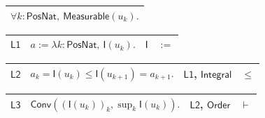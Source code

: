 \documentclass[11pt]{amsart}
\newlength{\FTCOneColumnBody}
\newlength{\FTCFourColumnBody}
\begin{document}
{\begin{tabular}{|@{}>{\centering\arraybackslash}m{\FTCOneColumnBody}|}
$\displaystyle \forall k:\textsf{PosNat},\ \textsf{Measurable}(u_k).$\\ \hline
\end{tabular}%
\par\setlength{\parskip}{0pt}\nointerlineskip
\noindent
\begin{tabular}{|@{}>{\centering\arraybackslash}m{0.078431\FTCFourColumnBody}|>{\centering\arraybackslash}m{0.535947\FTCFourColumnBody}|>{\centering\arraybackslash}m{0.281045\FTCFourColumnBody}|>{\centering\arraybackslash}m{0.104575\FTCFourColumnBody}|}\hline
\hypertarget{proof:L1}{$\displaystyle \textsf{L1}$} & $\displaystyle a:=\lambda k:\textsf{PosNat},\ \textsf{I}(u_k).$ & \hyperlink{def:I}{$\displaystyle \textsf{I}$} & $\displaystyle :=$\\ \hline
\end{tabular}%
\par\setlength{\parskip}{0pt}\nointerlineskip
\noindent
\begin{tabular}{|@{}>{\centering\arraybackslash}m{0.078431\FTCFourColumnBody}|>{\centering\arraybackslash}m{0.535947\FTCFourColumnBody}|>{\centering\arraybackslash}m{0.281045\FTCFourColumnBody}|>{\centering\arraybackslash}m{0.104575\FTCFourColumnBody}|}\hline
\hypertarget{proof:L2}{$\displaystyle \textsf{L2}$} & $\displaystyle a_k=\textsf{I}(u_k)\le\textsf{I}(u_{k+1})=a_{k+1}.$ & \hyperlink{proof:L1}{$\displaystyle \textsf{L1}$}, \hyperlink{lem:Integral}{$\displaystyle \textsf{Integral}$} & $\displaystyle \le$\\ \hline
\end{tabular}%
\par\setlength{\parskip}{0pt}\nointerlineskip
\noindent
\begin{tabular}{|@{}>{\centering\arraybackslash}m{0.078431\FTCFourColumnBody}|>{\centering\arraybackslash}m{0.535947\FTCFourColumnBody}|>{\centering\arraybackslash}m{0.281045\FTCFourColumnBody}|>{\centering\arraybackslash}m{0.104575\FTCFourColumnBody}|}\hline
\hypertarget{proof:L3}{$\displaystyle \textsf{L3}$} & $\displaystyle \textsf{Conv}((\textsf{I}(u_k))_k,\sup_k\textsf{I}(u_k)).$ & \hyperlink{proof:L2}{$\displaystyle \textsf{L2}$}, \hyperlink{lem:Order}{$\displaystyle \textsf{Order}$} & $\displaystyle \vdash$\\ \hline
\end{tabular}%
\par
}
\end{document}
